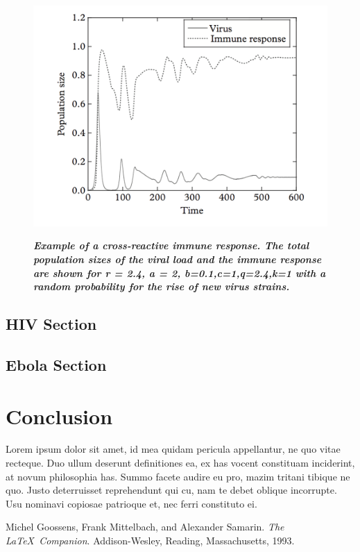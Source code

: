 \documentclass{article}
\begin{document}
\begin{figure}[h!]
    \centering
    \caption{\textbf{\textit{Example of a cross-reactive immune response. The total population sizes of the viral load and the immune response are shown for r = 2.4, a = 2, b=0.1,c=1,q=2.4,k=1 with a random probability for the rise of new virus strains.}}}
    \includegraphics[scale=.4]{imgs/hiv_graph2.png}
    \label{fig:hiv2}
\end{figure}

\subsection{HIV Section}

\subsection{Ebola Section}

\section{Conclusion}
\label{sub:Conclusion}
Lorem ipsum dolor sit amet, id mea quidam pericula appellantur, ne quo vitae recteque. Duo ullum deserunt definitiones ea, ex has vocent constituam inciderint, at novum philosophia has. Summo facete audire eu pro, mazim tritani tibique ne quo. Justo deterruisset reprehendunt qui cu, nam te debet oblique incorrupte. Usu nominavi copiosae patrioque et, nec ferri constituto ei.



\begin{thebibliography}{9}
Michel Goossens, Frank Mittelbach, and Alexander Samarin. 
\textit{The \LaTeX\ Companion}. 
Addison-Wesley, Reading, Massachusetts, 1993.
\end{thebibliography}
\end{document}
